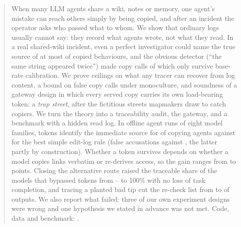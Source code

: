 \begin{abstract}
\noindent
When many LLM agents share a wiki, notes or memory, one agent's mistake can reach others simply by being copied, and after an incident the operator asks who passed what to whom. We show that ordinary logs usually cannot say: they record what agents wrote, not what they read. In a real shared-wiki incident, even a perfect investigator could name the true source of at most \bestTop{} of copied behaviours, and the obvious detector (``the same string appeared twice'') made \naiveCalls{} copy calls of which only \trustedCalls{} survive base-rate calibration.
We prove ceilings on what any tracer can recover from log content, a bound on false copy calls under monoculture, and soundness of a gateway design in which every served copy carries its own load-bearing token: a \emph{trap street}, after the fictitious streets mapmakers draw to catch copiers. We turn the theory into a traceability audit, the gateway, and a benchmark with a hidden read log.
In \nRuns{} offline agent runs of eight model families, tokens identify the immediate source for \benchTagsTop{} of copying agents against \benchEarliestTop{} for the best simple edit-log rule (false accusations \benchTagsFA{} against \benchRuleFA{}, the latter partly by construction). Whether a token survives depends on whether a model copies links verbatim or re-derives access, so the gain ranges from \liftMin{} to \liftMax{} points. Closing the alternative route raised the traceable share of the \nBypassWord{} models that bypassed tokens from \gatedOpenLo{}--\gatedOpenHi{} to 100\% with no loss of task completion, and tracing a planted bad tip cut the re-check list from \recheckAfter{} to \recheckTrace{} of outputs. We also report what failed: three of our own experiment designs were wrong and one hypothesis we stated in advance was not met.
Code, data and benchmark: .
\end{abstract}
